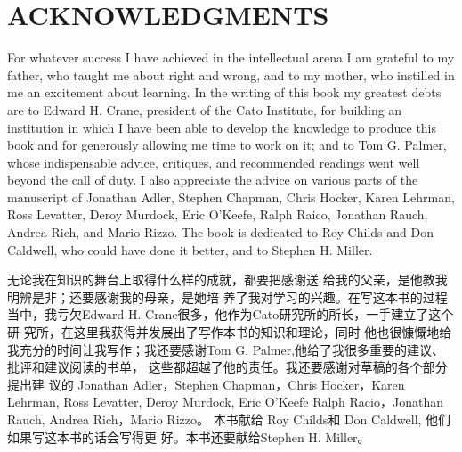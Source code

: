 \chapter*{ACKNOWLEDGMENTS}
\begin{paracol}{2}

For whatever success I have achieved in the intellectual arena I
am grateful to my father, who taught me about right and
wrong, and to my mother, who instilled in me an excitement
about learning. In the writing of this book my greatest debts
are to Edward H. Crane, president of the Cato Institute, for
building an institution in which I have been able to develop the
knowledge to produce this book and for generously allowing
me time to work on it; and to Tom G. Palmer, whose indispensable advice, critiques, and recommended readings went well beyond the call of duty. I also appreciate the advice on various
parts of the manuscript of Jonathan Adler, Stephen Chapman,
Chris Hocker, Karen Lehrman, Ross Levatter, Deroy Murdock,
Eric O'Keefe, Ralph Raico, Jonathan Rauch, Andrea Rich, and
Mario Rizzo. The book is dedicated to Roy Childs and Don
Caldwell, who could have done it better, and to Stephen H.
Miller.

\switchcolumn
无论我在知识的舞台上取得什么样的成就，都要把感谢送
给我的父亲，是他教我明辨是非；还要感谢我的母亲，是她培
养了我对学习的兴趣。在写这本书的过程当中，我亏欠Edward
H. Crane很多，他作为Cato研究所的所长，一手建立了这个研
究所，在这里我获得并发展出了写作本书的知识和理论，同时
他也很慷慨地给我充分的时间让我写作；我还要感谢Tom G.
Palmer,他给了我很多重要的建议、批评和建议阅读的书单，
这些都超越了他的责任。我还要感谢对草稿的各个部分提出建
议的 Jonathan Adler，Stephen Chapman，Chris Hocker，Karen Lehrman, Ross Levatter, Deroy Murdock, Eric O'Keefe Ralph
Racio，Jonathan Rauch, Andrea Rich，Mario Rizzo。 本书献给
Roy Childs和 Don Caldwell, 他们如果写这本书的话会写得更
好。本书还要献给Stephen H. Miller。

\end{paracol}